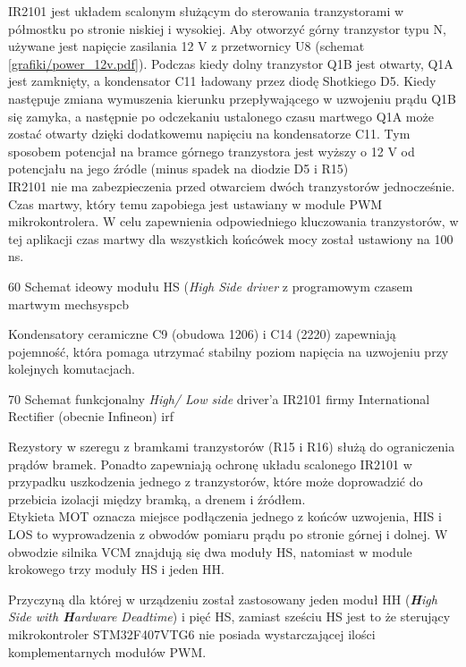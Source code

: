 IR2101 jest układem scalonym służącym do sterowania tranzystorami w półmostku po stronie niskiej i wysokiej. Aby otworzyć górny tranzystor typu N, używane jest napięcie zasilania 12 V z przetwornicy U8 (schemat \ref{grafiki/power_12v.pdf}). Podczas kiedy dolny tranzystor Q1B jest otwarty, Q1A jest zamknięty, a kondensator C11 ładowany przez diodę Shotkiego D5. Kiedy następuje zmiana wymuszenia kierunku przepływającego w uzwojeniu prądu Q1B się zamyka, a następnie po odczekaniu ustalonego czasu martwego Q1A może zostać otwarty dzięki dodatkowemu napięciu na kondensatorze C11. Tym sposobem potencjał na bramce górnego tranzystora jest wyższy o 12 V od potencjału na jego źródle (minus spadek na diodzie D5 i R15)\\
	
IR2101 nie ma zabezpieczenia przed otwarciem dwóch tranzystorów jednocześnie. Czas martwy, który temu zapobiega jest ustawiany w module PWM mikrokontrolera. W celu zapewnienia odpowiedniego kluczowania tranzystorów, w tej aplikacji czas martwy dla wszystkich końcówek mocy został ustawiony na 100 ns.

	{60}
	{Schemat ideowy modułu HS ({\it High Side driver} z programowym czasem martwym}
	{mechsyspcb}
	
Kondensatory ceramiczne C9 (obudowa 1206) i C14 (2220) zapewniają pojemność, która pomaga utrzymać stabilny poziom napięcia na uzwojeniu przy kolejnych komutacjach. 

	{70}
	{Schemat funkcjonalny {\it High/ Low side} driver'a IR2101 firmy International Rectifier (obecnie Infineon)}
	{irf}

Rezystory w szeregu z bramkami tranzystorów (R15 i R16) służą do ograniczenia prądów bramek. Ponadto zapewniają ochronę układu scalonego IR2101 w przypadku uszkodzenia jednego z tranzystorów, które może doprowadzić do przebicia izolacji między bramką, a drenem i źródłem. \\

Etykieta MOT oznacza miejsce podłączenia jednego z końców uzwojenia, HIS i LOS to wyprowadzenia z obwodów pomiaru prądu po stronie górnej i dolnej. W obwodzie silnika VCM znajdują się dwa moduły HS, natomiast w module krokowego trzy moduły HS i jeden HH.


Przyczyną dla której w urządzeniu został zastosowany jeden moduł HH (\textit{\textbf{H}igh Side with \textbf{H}ardware Deadtime}) i pięć HS, zamiast sześciu HS jest to że sterujący mikrokontroler STM32F407VTG6 nie posiada wystarczającej ilości komplementarnych modułów PWM.

